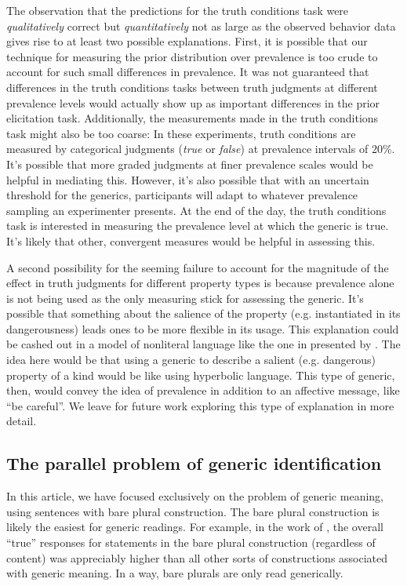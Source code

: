 \documentclass[10pt,letterpaper]{article}
\begin{document}
The observation that the predictions for the truth conditions task were \emph{qualitatively} correct but \emph{quantitatively} not as large as the observed behavior data gives rise to at least two possible explanations. First, it is possible that our technique for measuring the prior distribution over prevalence is too crude to account for such small differences in prevalence. It was not guaranteed that differences in the truth conditions tasks between truth judgments at different prevalence levels would actually show up as important differences in the prior elicitation task. 
Additionally, the measurements made in the truth conditions task might also be too coarse: In these experiments, truth conditions are measured by categorical judgments (\emph{true} or \emph{false}) at prevalence intervals of 20\%. It's possible that more graded judgments at finer prevalence scales would be helpful in mediating this. However, it's also possible that with an uncertain threshold for the generics, participants will adapt to whatever prevalence sampling an experimenter presents. At the end of the day, the truth conditions task is interested in measuring the prevalence level at which the generic is true. It's likely that other, convergent measures would be helpful in assessing this. 

A second possibility for the seeming failure to account for the magnitude of the effect in truth judgments for different property types is because prevalence alone is not being used as the only measuring stick for assessing the generic. It's possible that something about the salience of the property (e.g. instantiated in its dangerousness) leads ones to be more flexible in its usage\cite{Leslie2008}. This explanation could be cashed out in a model of nonliteral language like the one in presented by . The idea here would be that using a generic to describe a salient (e.g. dangerous) property of a kind would be like using hyperbolic language. This type of generic, then, would convey the idea of prevalence in addition to an affective message, like ``be careful''. We leave for future work exploring this type of explanation in more detail.


\subsection{The parallel problem of generic identification}

In this article, we have focused exclusively on the problem of generic meaning, using sentences with bare plural construction. The bare plural construction is likely the easiest for generic readings. For example, in the work of , the overall ``true'' responses for statements in the bare plural construction (regardless of content) was appreciably higher than all other sorts of constructions associated with generic meaning. In a way, bare plurals are only read generically. 
\end{document}
